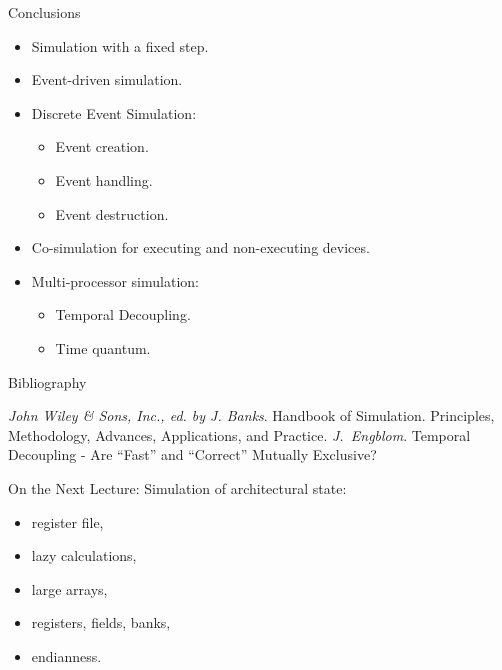 \begin{frame}{Conclusions}
\begin{itemize}
\item Simulation with a fixed step.
\item Event-driven simulation.
\item Discrete Event Simulation:
  \begin{itemize}
  \item Event creation.
  \item Event handling.
  \item Event destruction.
  \end{itemize}
\item Co-simulation for executing and non-executing devices.
\item Multi-processor simulation:
  \begin{itemize}
    \item Temporal Decoupling.
    \item Time quantum.
  \end{itemize}
\end{itemize}
\end{frame}

\begin{frame}[allowframebreaks]{Bibliography}
\begin{thebibliography}{99}
  \bibitem{} \textit{John Wiley \& Sons, Inc., ed. by J. Banks}. Handbook of
    Simulation. Principles, Methodology, Advances, Applications, and Practice.
  \bibitem{} \textit{J.~Engblom}. Temporal Decoupling - Are “Fast” and
    “Correct” Mutually Exclusive?
\end{thebibliography}
\end{frame}

\begin{frame}{On the Next Lecture:}
Simulation of architectural state:
\begin{itemize}
\item register file,
\item lazy calculations,
\item large arrays,
\item registers, fields, banks,
\item endianness.
\end{itemize}
\end{frame}

\finalslide


